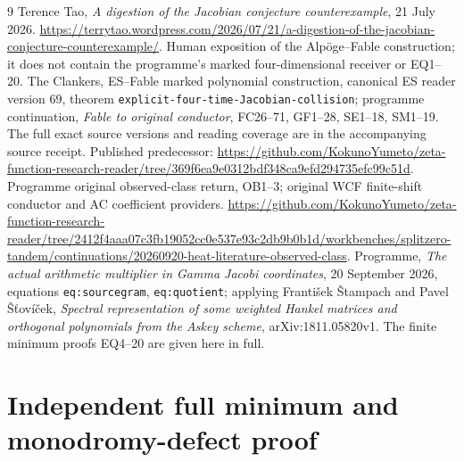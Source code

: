 \documentclass[11pt]{article}
\begin{document}
\begin{thebibliography}{9}
 Terence Tao, \emph{A digestion of the Jacobian conjecture
counterexample}, 21 July 2026.
\url{https://terrytao.wordpress.com/2026/07/21/a-digestion-of-the-jacobian-conjecture-counterexample/}.
Human exposition of the Alp\"oge--Fable construction; it does not
contain the programme's marked four-dimensional receiver or EQ1--20.
 The Clankers, ES--Fable marked polynomial construction,
canonical ES reader version 69, theorem
\texttt{explicit-four-time-Jacobian-collision}; programme continuation,
\emph{Fable to original conductor}, FC26--71, GF1--28, SE1--18,
SM1--19. The full exact source versions and reading coverage are in
the accompanying source receipt. Published predecessor:
\url{https://github.com/KokunoYumeto/zeta-function-research-reader/tree/369f6ea9e0312bdf348ca9efd294735efc99c51d}.
 Programme original observed-class return, OB1--3;
original WCF finite-shift conductor and AC coefficient providers.
\url{https://github.com/KokunoYumeto/zeta-function-research-reader/tree/2412f4aaa07c3fb19052cc0e537e93c2db9b0b1d/workbenches/splitzero-tandem/continuations/20260920-heat-literature-observed-class}.
 Programme, \emph{The actual arithmetic multiplier in
Gamma Jacobi coordinates}, 20 September 2026, equations
\texttt{eq:sourcegram}, \texttt{eq:quotient}; applying
Franti\v{s}ek \v{S}tampach and Pavel \v{S}\v{t}ov\'{i}\v{c}ek,
\emph{Spectral representation of some weighted Hankel matrices and
orthogonal polynomials from the Askey scheme}, arXiv:1811.05820v1.
The finite minimum proofs EQ4--20 are given here in full.
\end{thebibliography}

\endgroup

\clearpage\begingroup
\part*{Independent full minimum and monodromy-defect proof}
\newcommand{\indminC}{\mathbb C}
\newcommand{\indminim}{\operatorname{im}}
\newcommand{\indmindiag}{\operatorname{diag}}
\newcommand{\indminrank}{\operatorname{rank}}
\newcommand{\indminSpan}{\operatorname{span}}
\newcommand{\indminid}{\operatorname{id}}
\end{document}
